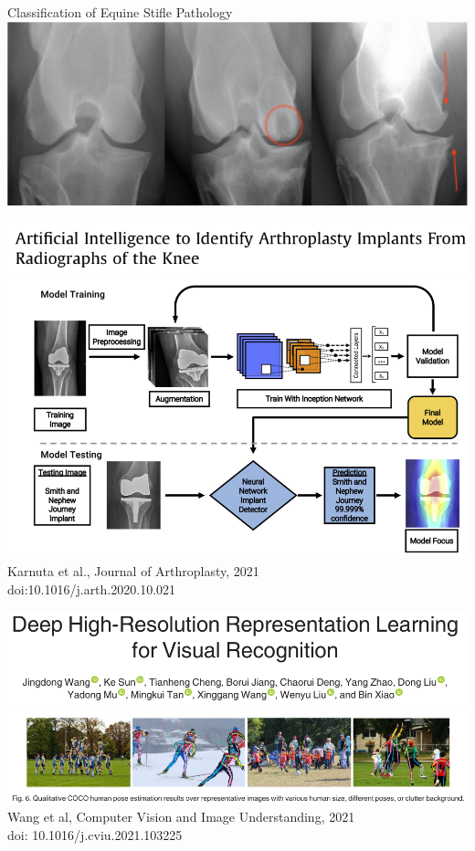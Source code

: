 \begin{frame}{Classification of Equine Stifle Pathology}
   \centering
   \includegraphics[width=0.85\linewidth]{images/stifle-pathologies.png}
\end{frame}

\begin{frame}
   \centering
   \includegraphics[width=0.7\linewidth]{images/tka-classification-title.png}
   \vfill
   \includegraphics[width=0.85\linewidth]{images/tka-classification.png}
   \vfill
   \tiny{Karnuta et al., Journal of Arthroplasty, 2021\\ doi:10.1016/j.arth.2020.10.021}
\end{frame}

\begin{frame}
   \centering
         \includegraphics[width=0.65\columnwidth]{images/hrnet-title.png}
   \vfill
   \includegraphics[width=\linewidth]{images/hrnet-human-pose.png}
   \vfill
   \tiny{Wang et al, Computer Vision and Image Understanding, 2021 \\ doi: 10.1016/j.cviu.2021.103225}
\end{frame}

